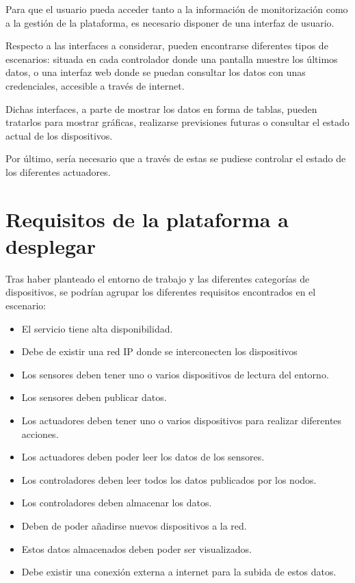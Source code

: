 Para que el usuario pueda acceder tanto a la información de monitorización como a la gestión de la plataforma, es necesario disponer de una interfaz de usuario.

Respecto a las interfaces a considerar, pueden encontrarse diferentes tipos de escenarios: situada en cada controlador donde una pantalla muestre los últimos datos, o  una interfaz web donde se puedan consultar los datos con unas credenciales, accesible a través de internet.

Dichas interfaces, a parte de mostrar los datos en forma de tablas, pueden tratarlos para mostrar gráficas, realizarse previsiones futuras o consultar el estado actual de los dispositivos.

Por último, sería necesario que a través de estas se pudiese controlar el estado de los diferentes actuadores. %

\section{Requisitos de la plataforma a desplegar}

Tras haber planteado el entorno de trabajo y las diferentes categorías de dispositivos, se podrían agrupar los diferentes requisitos encontrados en el escenario:

\begin{itemize}
    \item El servicio tiene alta disponibilidad.
    \item Debe de existir una red IP donde se interconecten los dispositivos
    \item Los sensores deben tener uno o varios dispositivos de lectura del entorno.
    \item Los sensores deben publicar datos.
    \item Los actuadores deben tener uno o varios dispositivos para realizar diferentes acciones.
    \item Los actuadores deben poder leer los datos de los sensores.
    \item Los controladores deben leer todos los datos publicados por los nodos.
    \item Los controladores deben almacenar los datos.
    \item Deben de poder añadirse nuevos dispositivos a la red.
    \item Estos datos almacenados deben poder ser visualizados.
    \item Debe existir una conexión externa a internet para la subida de estos datos.
\end{itemize}

